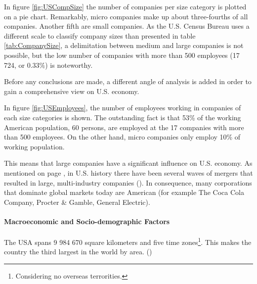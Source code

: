 In figure \ref{fig:USCompSize} the number of companies per size category is plotted on a pie chart. Remarkably, micro companies make up about  three-fourths of all companies. Another fifth are small companies. As the U.S. Census Bureau uses a different scale to classify company sizes than presented in table \ref{tab:CompanySize}, a delimitation between medium and large companies is not possible, but the low number of companies with more than 500 employees (17 724, or 0.33\%) is noteworthy.

Before any conclusions are made, a different angle of analysis is added in order to gain a comprehensive view on U.S. economy.




In figure \ref{fig:USEmployees}, the number of employees working in companies of each size categories is shown. The outstanding fact is that 53\% of the working American population, 60   persons, are employed at the 17  companies with more than 500 employees. On the other hand, micro companies only employ 10\% of working population.

This means that large companies have a significant influence on U.S. economy. As mentioned on page \pageref{par:USHistory}, in U.S. history there have been several waves of mergers that resulted in large, multi-industry companies (\cite{Winkler.1994b}). In consequence, many corporations that dominate global markets today are American (for example The Coca Cola Company, Procter \nolinebreak \& \nolinebreak Gamble, General Electric). 


\paragraph{Macroeconomic and Socio-demographic Factors}
The USA spans 9 984 670 square kilometers and five time zones\footnote{Considering no overseas terrorities.}. This makes the country the third largest in the world by area. (\cite{CentralIntelligenceAgency.2016})

